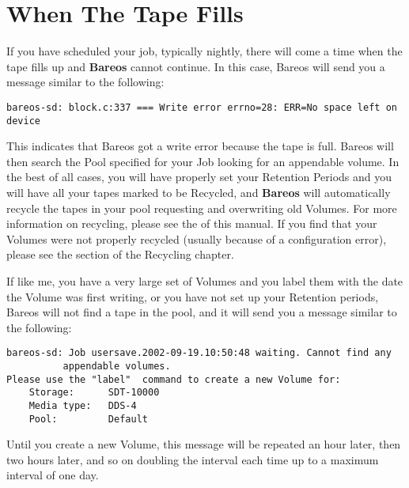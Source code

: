 
\section{When The Tape Fills}
\label{FullTape}

If you have scheduled your job, typically nightly, there will come a time when
the tape fills up and {\bf Bareos} cannot continue. In this case, Bareos will
send you a message similar to the following:

\footnotesize
\begin{verbatim}
bareos-sd: block.c:337 === Write error errno=28: ERR=No space left on device
\end{verbatim}
\normalsize

This indicates that Bareos got a write error because the tape is full. Bareos
will then search the Pool specified for your Job looking for an appendable
volume. In the best of all cases, you will have properly set your Retention
Periods and you will have all your tapes marked to be Recycled, and {\bf
Bareos} will automatically recycle the tapes in your pool requesting and
overwriting old Volumes. For more information on recycling, please see the
 of this manual. If you
find that your Volumes were not properly recycled (usually because of a
configuration error), please see the
 section of
the Recycling chapter.

If like me, you have a very large set of Volumes and you label them with the
date the Volume was first writing, or you have not set up your Retention
periods, Bareos will not find a tape in the pool, and it will send you a
message similar to the following:

\footnotesize
\begin{verbatim}
bareos-sd: Job usersave.2002-09-19.10:50:48 waiting. Cannot find any
          appendable volumes.
Please use the "label"  command to create a new Volume for:
    Storage:      SDT-10000
    Media type:   DDS-4
    Pool:         Default
\end{verbatim}
\normalsize

Until you create a new Volume, this message will be repeated an hour later,
then two hours later, and so on doubling the interval each time up to a
maximum interval of one day.

